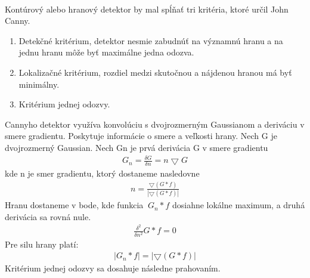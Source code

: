 \documentclass[12pt]{article}
\begin{document}
\paragraph{}
Kontúrový alebo hranový detektor by mal spĺňať tri kritéria, ktoré určil John Canny.
\begin{enumerate}
  \item Detekčné kritérium, detektor nesmie zabudnúť na významnú hranu a na jednu hranu môže byť maximálne jedna odozva.
  \item Lokalizačné kritérium, rozdiel medzi skutočnou a nájdenou hranou má byť minimálny.
  \item Kritérium jednej odozvy.
\end{enumerate}
Cannyho detektor využíva konvolúciu s dvojrozmerným Gaussianom a deriváciu v smere gradientu.
Poskytuje informácie o smere a veľkosti hrany. Nech G je dvojrozmerný Gaussian. Nech Gn je prvá derivácia G v smere gradientu
\begin{align*}
G_n = \frac{\delta G}{\delta n} = n\bigtriangledown G
\end{align*}
kde n je smer gradientu, ktorý dostaneme nasledovne
\begin{align*}
n = \frac{\bigtriangledown(G * f)}{|\bigtriangledown(G * f)|}
\end{align*}
Hranu dostaneme v bode, kde funkcia \begin{math}\ G_n *f  \end{math} dosiahne lokálne maximum, a druhá derivácia sa rovná nule.
\begin{align*}
\frac{\delta^2}{\delta n^2} G * f = 0
\end{align*}
Pre silu hrany platí:
\begin{align*}
|G_n * f| = |\bigtriangledown (G * f)|
\end{align*}
Kritérium jednej odozvy sa dosahuje následne prahovaním. 
\cite{DIP, JCanny}
\end{document}
